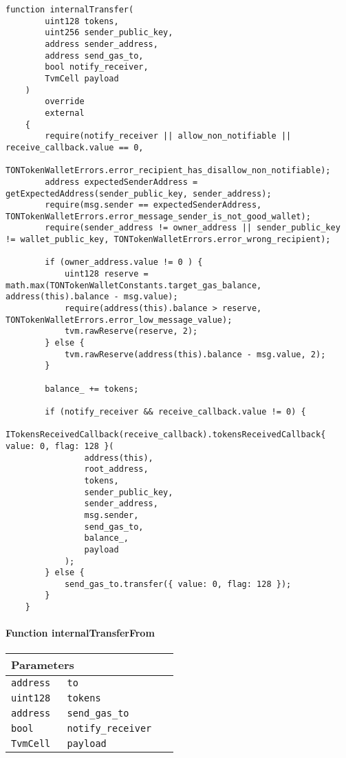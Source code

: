 \begin{lstlisting}[firstnumber=370]
    function internalTransfer(
        uint128 tokens,
        uint256 sender_public_key,
        address sender_address,
        address send_gas_to,
        bool notify_receiver,
        TvmCell payload
    )
        override
        external
    {
        require(notify_receiver || allow_non_notifiable || receive_callback.value == 0,
                TONTokenWalletErrors.error_recipient_has_disallow_non_notifiable);
        address expectedSenderAddress = getExpectedAddress(sender_public_key, sender_address);
        require(msg.sender == expectedSenderAddress, TONTokenWalletErrors.error_message_sender_is_not_good_wallet);
        require(sender_address != owner_address || sender_public_key != wallet_public_key, TONTokenWalletErrors.error_wrong_recipient);

        if (owner_address.value != 0 ) {
            uint128 reserve = math.max(TONTokenWalletConstants.target_gas_balance, address(this).balance - msg.value);
            require(address(this).balance > reserve, TONTokenWalletErrors.error_low_message_value);
            tvm.rawReserve(reserve, 2);
        } else {
            tvm.rawReserve(address(this).balance - msg.value, 2);
        }

        balance_ += tokens;

        if (notify_receiver && receive_callback.value != 0) {
            ITokensReceivedCallback(receive_callback).tokensReceivedCallback{ value: 0, flag: 128 }(
                address(this),
                root_address,
                tokens,
                sender_public_key,
                sender_address,
                msg.sender,
                send_gas_to,
                balance_,
                payload
            );
        } else {
            send_gas_to.transfer({ value: 0, flag: 128 });
        }
    }
\end{lstlisting}

\paragraph{Function internalTransferFrom}


\ifsoltables
\noindent\begin{tabular}{|l|l|p{5cm}|}\hline
\multicolumn{3}{|l|}{\bf Parameters}\\\hline
\tt address & \tt to &\\\hline
\tt uint128 & \tt tokens &\\\hline
\tt address & \tt send\_{}gas\_{}to &\\\hline
\tt bool & \tt notify\_{}receiver &\\\hline
\tt TvmCell & \tt payload &\\\hline
\end{tabular}
\fi

